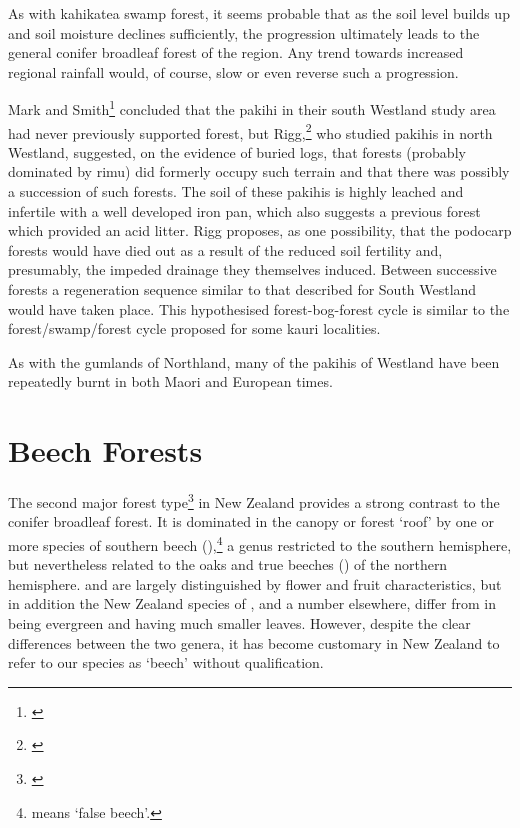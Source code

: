 As with kahikatea swamp forest, it seems probable that as the soil level builds up and soil moisture declines sufficiently, the progression ultimately leads to the general conifer broadleaf forest of the region.
Any trend towards increased regional rainfall would, of course, slow or even reverse such a progression.

Mark and Smith\footnote{\cite{mark1975lowland}} concluded that the pakihi in their south Westland study area had never previously supported forest, but Rigg,\footnote{\cite{rigg1962pakihi}} who studied pakihis in north Westland, suggested, on the evidence of buried logs, that forests (probably dominated by rimu) did formerly occupy such terrain and that there was possibly a succession of such forests.
The soil of these pakihis is highly leached and infertile with a well developed iron pan, which also suggests a previous forest which provided an acid litter.
Rigg proposes, as one possibility, that the podocarp forests would have died out as a result of the reduced soil fertility and, presumably, the impeded drainage they themselves induced.
Between successive forests a regeneration sequence similar to that described for South Westland would have taken place.
This hypothesised forest-bog-forest cycle is similar to the forest/swamp/forest cycle proposed for some kauri localities.

As with the gumlands of Northland, many of the pakihis of Westland have been repeatedly burnt in both Maori and European times.

\chapter{Beech Forests}

The second major forest type\footnote{\cite{wardle1984beeches}} in New Zealand provides a strong contrast to the conifer broadleaf forest.
It is dominated in the canopy or forest `roof' by one or more species of southern beech (),\footnote{ means `false beech'.} a genus restricted to the southern hemisphere, but nevertheless related to the oaks and true beeches () of the northern hemisphere.  and  are largely distinguished by flower and fruit characteristics, but in addition the New Zealand species of , and a number elsewhere, differ from  in being evergreen and having much smaller leaves.
However, despite the clear differences between the two genera, it has become customary in New Zealand to refer to our species as `beech' without qualification.

